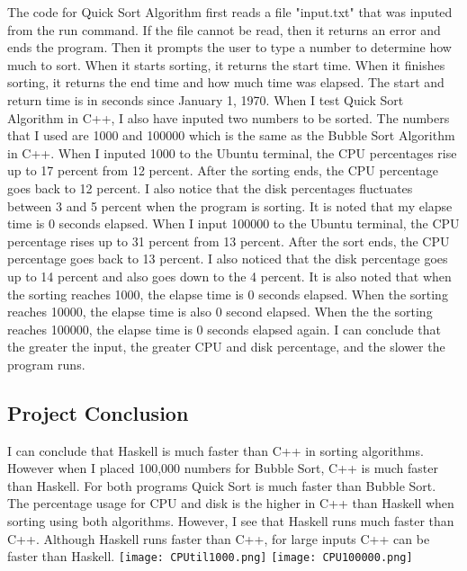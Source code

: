 \documentclass{article}
\begin{document}
The code for Quick Sort Algorithm first reads a file "input.txt" that was inputed from the run command. If the file cannot be read, then it returns an error and ends the program. Then it prompts the user to type a number to determine how much to sort. When it starts sorting, it returns the start time. When it finishes sorting, it returns the end time and how much time was elapsed. The start and return time is in seconds since January 1, 1970. 
\newline \newline When I test Quick Sort Algorithm in C++, I also have inputed two numbers to be sorted. The numbers that I used are 1000 and 100000 which is the same as the Bubble Sort Algorithm in C++. When I inputed 1000 to the Ubuntu terminal, the CPU percentages rise up to 17 percent from 12 percent. After the sorting ends, the CPU percentage goes back to 12 percent. I also notice that the disk percentages fluctuates between 3 and 5 percent when the program is sorting. It is noted that my elapse time is 0 seconds elapsed. When I input 100000 to the Ubuntu terminal, the CPU percentage rises up to 31 percent from 13 percent. After the sort ends, the CPU percentage goes back to 13 percent. I also noticed that the disk percentage goes up to 14 percent and also goes down to the 4 percent. It is also noted that when the sorting reaches 1000, the elapse time is 0 seconds elapsed. When the sorting reaches 10000, the elapse time is also 0 second elapsed. When the the sorting reaches 100000, the elapse time is 0 seconds elapsed again. I can conclude that the greater the input, the greater CPU and disk percentage, and the slower the program runs. 

\subsection{Project Conclusion}
I can conclude that Haskell is much faster than C++ in sorting algorithms. However when I placed 100,000 numbers for Bubble Sort, C++ is much faster than Haskell. For both programs Quick Sort is much faster than Bubble Sort. The percentage usage for CPU and disk is the higher in C++ than Haskell when sorting using both algorithms. However, I see that Haskell runs much faster than C++. Although Haskell runs faster than C++, for large inputs C++ can be faster than Haskell.
\newline \newline
  \texttt{[image: CPUtil1000.png]}
  \newline \newline
  \texttt{[image: CPU100000.png]}
  
\end{document}
